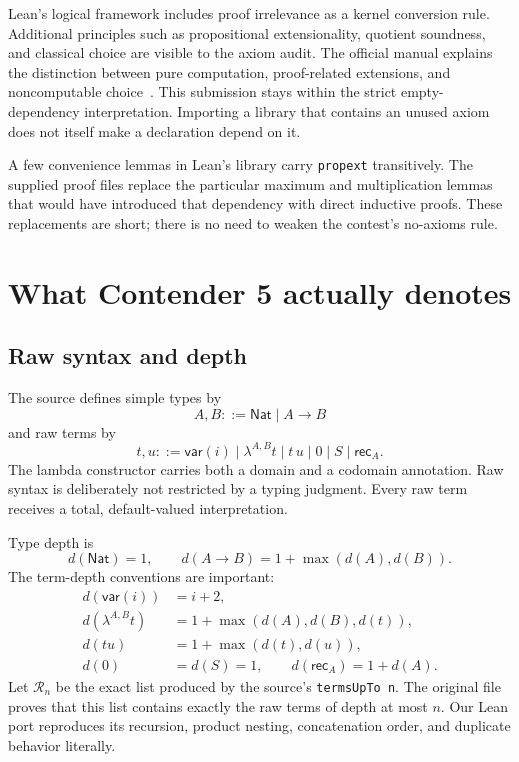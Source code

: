 \documentclass[11pt,letterpaper]{article}
\theoremstyle{definition}
\newcommand{\code}[1]{\texttt{#1}}
\begin{document}
Lean's logical framework includes proof irrelevance as a kernel conversion
rule. Additional principles such as propositional extensionality, quotient
soundness, and classical choice are visible to the axiom audit. The official
manual explains the distinction between pure computation, proof-related
extensions, and noncomputable choice~\cite{leanaxioms}. This submission stays
within the strict empty-dependency interpretation. Importing a library that
contains an unused axiom does not itself make a declaration depend on it.

A few convenience lemmas in Lean's library carry \code{propext} transitively.
The supplied proof files replace the particular maximum and multiplication
lemmas that would have introduced that dependency with direct inductive
proofs. These replacements are short; there is no need to weaken the contest's
no-axioms rule.

\section{What Contender 5 actually denotes}
\label{sec:baseline}

\subsection{Raw syntax and depth}

The source defines simple types by
\[
 A,B ::= \mathsf{Nat}\mid A\to B
\]
and raw terms by
\[
 t,u ::= \mathsf{var}(i)\mid\lambda^{A,B}t\mid t\,u
          \mid 0\mid S\mid\mathsf{rec}_A.
\]
The lambda constructor carries both a domain and a codomain annotation.
Raw syntax is deliberately not restricted by a typing judgment. Every raw
term receives a total, default-valued interpretation.

Type depth is
\[
 d(\mathsf{Nat})=1,\qquad d(A\to B)=1+\max(d(A),d(B)).
\]
The term-depth conventions are important:
\begin{align*}
 d(\mathsf{var}(i))&=i+2,\\
 d(\lambda^{A,B}t)&=1+\max(d(A),d(B),d(t)),\\
 d(tu)&=1+\max(d(t),d(u)),\\
 d(0)&=d(S)=1,\qquad d(\mathsf{rec}_A)=1+d(A).
\end{align*}
Let \(\mathcal R_n\) be the exact list produced by the source's
\code{termsUpTo n}. The original file proves that this list contains exactly
the raw terms of depth at most \(n\). Our Lean port reproduces its recursion,
product nesting, concatenation order, and duplicate behavior literally.
\end{document}

